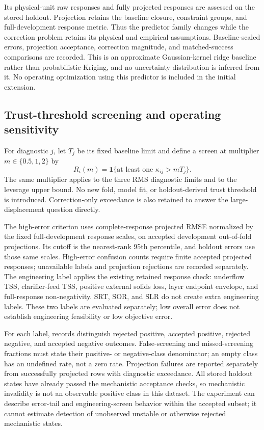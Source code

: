 \documentclass[a4paper,fleqn]{cas-sc}
\begin{document}
Its physical-unit raw responses and fully projected responses are assessed on the stored holdout. Projection retains the baseline closure, constraint groups, and full-development response metric. Thus the predictor family changes while the correction problem retains its physical and empirical assumptions. Baseline-scaled errors, projection acceptance, correction magnitude, and matched-success comparisons are recorded. This is an approximate Gaussian-kernel ridge baseline rather than probabilistic Kriging, and no uncertainty distribution is inferred from it. No operating optimization using this predictor is included in the initial extension.

\subsection{Trust-threshold screening and operating sensitivity}

For diagnostic $j$, let $T_j$ be its fixed baseline limit and define a screen at multiplier $m\in\{0.5,1,2\}$ by
\begin{equation}
 R_i(m)=\mathbf1\{\text{at least one }\kappa_{ij}>mT_j\}.
\label{eq:Sscreen}
\end{equation}
The same multiplier applies to the three RMS diagnostic limits and to the leverage upper bound. No new fold, model fit, or holdout-derived trust threshold is introduced. Correction-only exceedance is also retained to answer the large-displacement question directly.

The high-error criterion uses complete-response projected RMSE normalized by the fixed full-development response scales, on accepted development out-of-fold projections. Its cutoff is the nearest-rank 95th percentile, and holdout errors use those same scales. High-error confusion counts require finite accepted projected responses; unavailable labels and projection rejections are recorded separately. The engineering label applies the existing retained response check: underflow TSS, clarifier-feed TSS, positive external solids loss, layer endpoint envelope, and full-response non-negativity. SRT, SOR, and SLR do not create extra engineering labels. These two labels are evaluated separately; low overall error does not establish engineering feasibility or low objective error.

For each label, records distinguish rejected positive, accepted positive, rejected negative, and accepted negative outcomes. False-screening and missed-screening fractions must state their positive- or negative-class denominator; an empty class has an undefined rate, not a zero rate. Projection failures are reported separately from successfully projected rows with diagnostic exceedance. All stored holdout states have already passed the mechanistic acceptance checks, so mechanistic invalidity is not an observable positive class in this dataset. The experiment can describe error-tail and engineering-screen behavior within the accepted subset; it cannot estimate detection of unobserved unstable or otherwise rejected mechanistic states.
\end{document}
